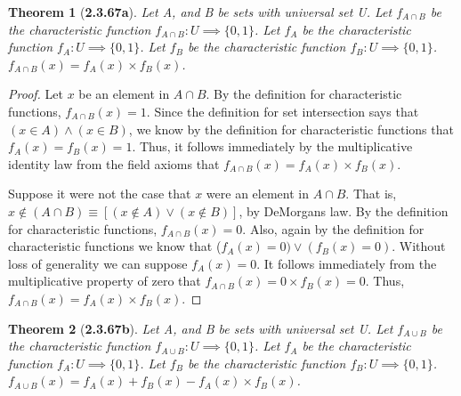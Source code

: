 \documentclass[a4paper, 12pt]{article}
\theoremstyle{plain}
\newtheorem*{theorem*}{Theorem}
\begin{document}
\pagebreak


\begin{theorem*}[\textbf{2.3.67a}]
    Let A, and B be sets with universal set U. Let $f_{A \cap B}$ be the characteristic 
    function $f_{A \cap B}: U \implies \{0, 1\}$. Let $f_{A}$ be the characteristic function 
    $f_{A}: U \implies \{0, 1\}$. Let $f_{B}$ be the characteristic function \newline 
    $f_{B}: U \implies \{0, 1\}$. $f_{A \cap B}(x) = f_{A}(x) \times f_{B}(x)$.
\end{theorem*}

\begin{proof}
    Let $x$ be an element in $A \cap B$. By the definition for characteristic functions, 
    $f_{A \cap B}(x) = 1$. Since the definition for set intersection says that \newline 
    $(x \in A) \land (x \in B)$, we know by the definition for characteristic functions that 
    $f_{A}(x) = f_{B}(x) = 1$. Thus, it follows immediately by the multiplicative identity law 
    from the field axioms that $f_{A \cap B}(x) = f_{A}(x) \times f_{B}(x)$.
    
    Suppose it were not the case that $x$ were an element in $A \cap B$. That is, 
    $x \notin (A \cap B) \equiv [(x \notin A) \lor (x \notin B)]$, by DeMorgans law. By the 
    definition for characteristic functions, $f_{A \cap B}(x) = 0$. Also, again by the definition 
    for characteristic functions we know that ($f_{A}(x) = 0) \lor (f_{B}(x) = 0)$. Without loss 
    of generality we can suppose $f_{A}(x) = 0$. It follows immediately from the multiplicative 
    property of zero that $f_{A \cap B}(x) = 0 \times f_{B}(x) = 0$. Thus, 
    $f_{A \cap B}(x) = f_{A}(x) \times f_{B}(x)$.
\end{proof}

\pagebreak


\begin{theorem*}[\textbf{2.3.67b}]
    Let A, and B be sets with universal set U. Let $f_{A \cup B}$ be the characteristic 
    function $f_{A \cup B}: U \implies \{0, 1\}$. Let $f_{A}$ be the characteristic 
    function $f_{A}: U \implies \{0, 1\}$. Let $f_{B}$ be the characteristic function 
    \newline $f_{B}: U \implies \{0, 1\}$. \newline 
    $f_{A \cup B}(x) = f_{A}(x) + f_{B}(x) - f_{A}(x) \times f_{B}(x)$.
\end{theorem*}
\end{document}
